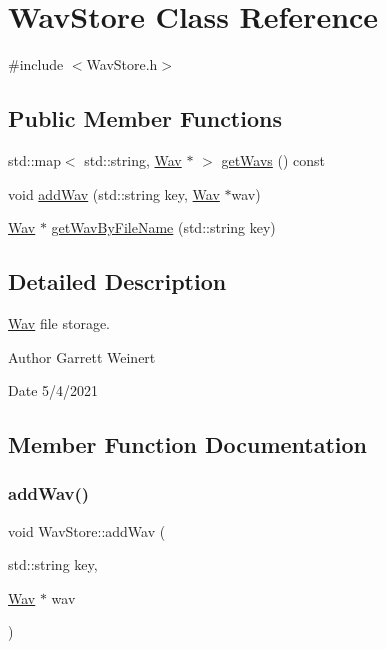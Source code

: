 \hypertarget{classWavStore}{}\section{Wav\+Store Class Reference}
\label{classWavStore}


{\ttfamily \#include $<$Wav\+Store.\+h$>$}

\subsection*{Public Member Functions}
\begin{DoxyCompactItemize}
\item 
std\+::map$<$ std\+::string, \hyperlink{classWav}{Wav} $\ast$ $>$ \hyperlink{classWavStore_a859da99c5b79ff98c0582fee694bf28c}{get\+Wavs} () const
\item 
void \hyperlink{classWavStore_a9a6a1112d64f48a0bcf93ac4a59771ef}{add\+Wav} (std\+::string key, \hyperlink{classWav}{Wav} $\ast$wav)
\item 
\hyperlink{classWav}{Wav} $\ast$ \hyperlink{classWavStore_a7288434f1eeb9e026e3cb5aea92dc95b}{get\+Wav\+By\+File\+Name} (std\+::string key)
\end{DoxyCompactItemize}


\subsection{Detailed Description}
\hyperlink{classWav}{Wav} file storage. \begin{DoxyAuthor}{Author}
Garrett Weinert 
\end{DoxyAuthor}
\begin{DoxyDate}{Date}
5/4/2021 
\end{DoxyDate}


\subsection{Member Function Documentation}
\mbox{\label{classWavStore_a9a6a1112d64f48a0bcf93ac4a59771ef}} 
\subsubsection{\texorpdfstring{add\+Wav()}{addWav()}}
{\footnotesize\ttfamily void Wav\+Store\+::add\+Wav (\begin{DoxyParamCaption}\item[{std\+::string}]{key,  }\item[{\hyperlink{classWav}{Wav} $\ast$}]{wav }\end{DoxyParamCaption})}

